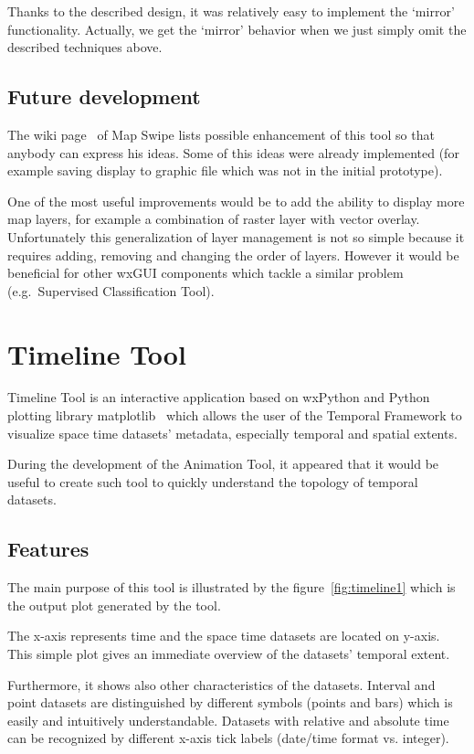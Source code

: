\documentclass[a4paper,12pt,oneside]{book}
\newcommand{\tf}{Temporal Framework\xspace}
\newcommand{\at}{Animation Tool\xspace}
\newcommand{\ms}{Map Swipe\xspace}
\begin{document}
Thanks to the described design, it was relatively easy to implement the `mirror' functionality.
Actually, we get the `mirror' behavior when we just simply omit the described techniques above.

\subsection{Future development}
The wiki page~\cite{mapswipeWiki} of \ms lists possible enhancement of this tool
so that anybody can express his ideas. Some of this ideas were already implemented
(for example saving display to graphic file which was not in the initial prototype).

One of the most useful improvements would be to add the ability to display
more map layers, for example a combination of raster layer with vector overlay.
Unfortunately this generalization of layer management is not so simple
because it requires adding, removing and changing the order of layers.
However it would be beneficial for other wxGUI components which tackle a similar problem
(e.g.\ Supervised Classification Tool).

\section{Timeline Tool}
Timeline Tool is an interactive application based on wxPython and Python plotting library matplotlib~\cite{matplotlib} which allows
the user of the \tf to visualize space time datasets' metadata, especially temporal and spatial extents.

During the development of the \at, it appeared that it would be useful to create such tool
to quickly understand the topology of temporal datasets.

\subsection{Features}
The main purpose of this tool is illustrated by the figure~\ref{fig:timeline1}
which is the output plot generated by the tool.

The x-axis represents time and the space time datasets are located on y-axis.
This simple plot gives an immediate overview of the datasets' temporal extent.

Furthermore, it shows also other characteristics of the datasets.
Interval and point datasets are distinguished by different symbols (points and bars)
which is easily and intuitively understandable.
Datasets with relative and absolute time can be recognized by different x-axis tick labels (date/time format vs. integer).
\end{document}
